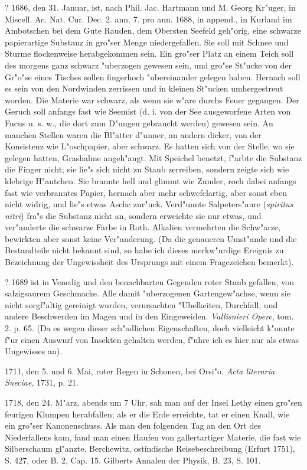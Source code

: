 \documentclass[a4paper, 11pt, oneside, polutonikogreek, german]{article}
\begin{document}
? 1686, den 31. Januar, ist, nach Phil. Jac. Hartmann und M. Georg Kr"uger, in Miscell. Ac. Nat. Cur. Dec. 2. ann. 7. pro ann. 1688, in append., in Kurland im Ambotschen bei dem Gute Rauden, dem Obersten Seefeld geh"orig, eine schwarze papierartige Substanz in gro"ser Menge niedergefallen. Sie soll mit Schnee und Sturme flockenweise herabgekommen sein. Ein gro"ser Platz an einem Teich soll des morgens ganz schwarz "uberzogen gewesen sein, und gro"se St"ucke von der Gr"o"se eines Tisches sollen fingerhoch "ubereinander gelegen haben. Hernach soll es sein von den Nordwinden zerrissen und in kleinen St"ucken umhergestreut worden. Die Materie war schwarz, als wenn sie w"are durchs Feuer gegangen. Der Geruch soll anfangs fast wie Seemist (d. i. von der See ausgeworfene Arten von Fucus u. s. w., die dort zum D"ungen gebraucht werden) gewesen sein. An manchen Stellen waren die Bl"atter d"unner, an andern dicker, von der Konsistenz wie L"oschpapier, aber schwarz. Es hatten sich von der Stelle, wo sie gelegen hatten, Grashalme angeh"angt. Mit Speichel benetzt, f"arbte die Substanz die Finger nicht; sie lie"s sich nicht zu Staub zerreiben, sondern zeigte sich wie klebrige H"autchen. Sie brannte hell und glimmt wie Zunder, roch dabei anfangs fast wie verbranntes Papier, hernach aber mehr schwefelartig, aber sonst eben nicht widrig, und lie"s etwas Asche zur"uck. Verd"unnte Salpeters"aure (\emph{spiritus nitri}) fra"s die Substanz nicht an, sondern erweichte sie nur etwas, und ver"anderte die schwarze Farbe in Roth. Alkalien vermehrten die Schw"arze, bewirkten aber sonst keine Ver"anderung. (Da die genaueren Umst"ande und die Bestandteile nicht bekannt sind, so habe ich dieses merkw"urdige Ereignis zu Bezeichnung der Ungewissheit des Ursprungs mit einem Fragezeichen bemerkt).

? 1689 ist in Venedig und den benachbarten Gegenden roter Staub gefallen, von salzigsaurem Geschmacke. Alle damit "uberzogenen Gartengew"achse, wenn sie nicht sorgf"altig gereinigt wurden, verursachten "Ubelkeiten, Durchfall, und andere Beschwerden im Magen und in den Eingeweiden. \emph{Vallisnieri Opere}, tom. 2. p. 65. (Da es wegen dieser sch"adlichen Eigenschaften, doch vielleicht k"onnte f"ur einen Auswurf von Insekten gehalten werden, f"uhre ich es hier nur als etwas Ungewisses an).

1711, den 5. und 6. Mai, roter Regen in Schonen, bei Orsi"o. \emph{Acta literaria Sueciae}, 1731, p. 21.

1718, den 24. M"arz, abends um 7 Uhr, sah man auf der Insel Lethy einen gro"sen feurigen Klumpen herabfallen; als er die Erde erreichte, tat er einen Knall, wie ein gro"ser Kanonenschuss. Als man den folgenden Tag an den Ort des Niederfallens kam, fand man einen Haufen von gallertartiger Materie, die fast wie Silberschaum gl"anzte. Berchewitz, ostindische Reisebeschreibung (Erfurt 1751), S. 427, oder B. 2, Cap. 15. Gilberts Annalen der Physik, B. 23, S. 101.
\end{document}
